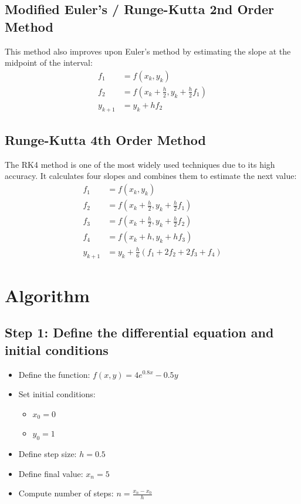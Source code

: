 \documentclass[a4paper,12pt]{article}
\begin{document}
	\subsection*{Modified Euler’s / Runge-Kutta 2nd Order Method}
	This method also improves upon Euler’s method by estimating the slope at the midpoint of the interval:
	\begin{align*}
		f_1 &= f(x_k, y_k) \\
		f_2 &= f\left(x_k + \frac{h}{2}, y_k + \frac{h}{2}f_1\right) \\
		y_{k+1} &= y_k + h f_2
	\end{align*}
	
	\subsection*{Runge-Kutta 4th Order Method}
	The RK4 method is one of the most widely used techniques due to its high accuracy. It calculates four slopes and combines them to estimate the next value:
	\begin{align*}
		f_1 &= f(x_k, y_k) \\
		f_2 &= f\left(x_k + \frac{h}{2}, y_k + \frac{h}{2} f_1\right) \\
		f_3 &= f\left(x_k + \frac{h}{2}, y_k + \frac{h}{2} f_2\right) \\
		f_4 &= f(x_k + h, y_k + h f_3) \\
		y_{k+1} &= y_k + \frac{h}{6} (f_1 + 2f_2 + 2f_3 + f_4)
	\end{align*}
	
	\section*{Algorithm}
	
	\subsection*{Step 1: Define the differential equation and initial conditions}
	\begin{itemize}
		\item Define the function: \( f(x, y) = 4e^{0.8x} - 0.5y \)
		\item Set initial conditions:
		\begin{itemize}
			\item \( x_0 = 0 \)
			\item \( y_0 = 1 \)
		\end{itemize}
		\item Define step size: \( h = 0.5 \)
		\item Define final value: \( x_n = 5 \)
		\item Compute number of steps: \( n = \frac{x_n - x_0}{h} \)
	\end{itemize}
	
\end{document}
